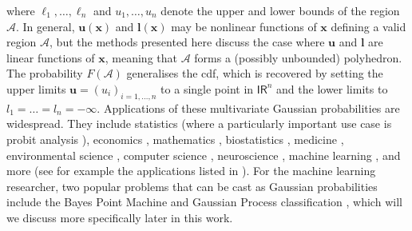 \documentclass[twoside,11pt]{article}
\def\x{{\mathbf x}}
\def\l{{\mathbf l}}
\def\u{{\mathbf u}}
\def\regionA{\mathcal{A}}
\newcommand{\reals}{\mathsf{I\!R}}
\begin{document}
where $\ell_1,{\ldots} ,\ell_n$ and $u_1,{\ldots} ,u_n$ denote the upper and lower bounds of the region $\regionA$.  In general, $\u(\x)$ and $\l(\x)$ may be nonlinear functions of $\x$ defining a valid region $\regionA$, but the methods presented here discuss the case where $\u$ and $\l$ are linear functions of $\x$, meaning that $\regionA$ forms a (possibly unbounded) polyhedron. The probability $F(\regionA)$ generalises the cdf, which is recovered by setting the upper limits $\u=(u_i)_{i=1,\dots,n}$ to a single point in $\reals^n$ and the lower limits to $l_1={\ldots} =l_n = -\infty$. Applications of these multivariate Gaussian probabilities are widespread. They include statistics \citep{genz92, joeMVNcdfJASA1995, Hothorn05unbiasedrecursive} (where a particularly important use case is probit analysis \citep{AshfordSowden1970,SicklesTabuman1986,Gibbons1996}), economics \citep{Boyle05pricingoptions}, mathematics \citep{Hickernell99theasymptotic}, biostatistics \citep{thiebautCMPB2004,zhaoCSDA2005}, medicine \citep{lesaffre1991}, environmental science \citep{Buccianti_computationalinvestigations}, computer science \citep{Klerk_onapproximate}, neuroscience \citep{Pillow04maximumlikelihood}, machine learning \citep{liaoICML2007}, and more (see for example the applications listed in \citet{gassmann2002}).  For the machine learning researcher, two popular problems that can be cast as Gaussian probabilities include the Bayes Point Machine \cite[]{herbrichBook} and Gaussian Process classification \cite[]{rasmussenBook, KussRasmussen2005}, which will we discuss more specifically later in this work.
\end{document}
